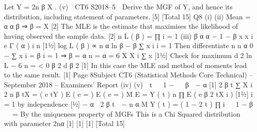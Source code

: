 \documentclass[a4paper,12pt]{article}
\begin{document}
Let Y = 2n β X .
(v)

CT6 S2018–5 
Derive the MGF of Y, and hence its distribution, including statement of
parameters.[5]
[Total 15]
Q8
(i)
(ii)
Mean = α
α
β ⇒ β = X
[2]
The MLE is the estimate that maximises the likelihood of having observed the
sample data.
[2]
n
L ( β ) = ∏
i = 1
(iii)
β α α − 1 − β x
x i e
Γ ( α )
i
n
[11⁄2]
log L ( β ) ∝ n α ln β − β ∑ x i
i = 1
Then differentiate
n
n α
0
− ∑ x i =
β
i = 1
⇒ β = α n
= α = 6
X
X
i
∑ x
[11⁄2]
Check for maximum
d 2 ln L − 6 n
=
< 0
β 2
d β 2 [1]
In this case the MLE and method of moments lead to the same result. [1]
Page 8Subject CT6 (Statistical Methods Core Technical) – September 2018 – Examiners’ Report
(iv)
(v)

t 
 1 − 
 β 
− α
[1]
2 β t ∑ X i
2 n β tX
=
( e tY ) E ( e =
) E ( e =
)
M
E =
Y ( t )
n
∏ E ( e β
2 tX i
)
[11⁄2]
i = 1
by independence
[1⁄2]
− α
 2 β t 
− n α
M Y ( t ) =
( 1 − 2 t )
∏ i   1 − β   =
By the uniqueness property of MGFs
This is a Chi Squared distribution with parameter 2nα
[1]
[1]
[1]
[Total 15]
\end{document}
